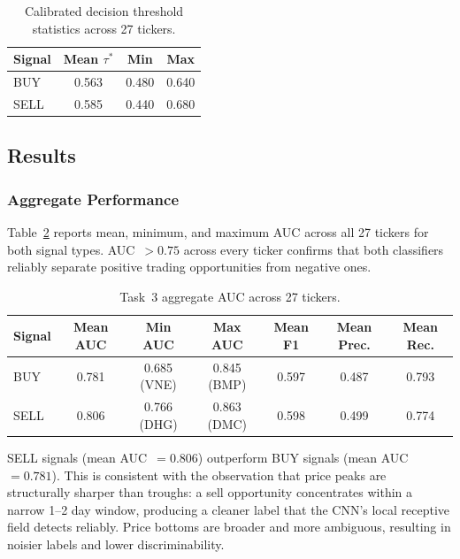 \documentclass[12pt, a4paper]{article}
\begin{document}
\begin{table}[h]
\centering
\caption{Calibrated decision threshold statistics across 27 tickers.}
\label{tab:t3_thresholds}
\renewcommand{\arraystretch}{1.3}
\begin{tabular}{lccc}
\hline
\textbf{Signal} & \textbf{Mean} $\tau^*$ & \textbf{Min} & \textbf{Max} \\
\hline
BUY  & 0.563 & 0.480 & 0.640 \\
SELL & 0.585 & 0.440 & 0.680 \\
\hline
\end{tabular}
\end{table}

\subsection{Results}

\subsubsection{Aggregate Performance}

Table~\ref{tab:t3_summary} reports mean, minimum, and maximum AUC
across all 27 tickers for both signal types. AUC~$> 0.75$ across
every ticker confirms that both classifiers reliably separate
positive trading opportunities from negative ones.




\begin{table}[h]
\centering
\caption{Task~3 aggregate AUC across 27 tickers.}
\label{tab:t3_summary}
\renewcommand{\arraystretch}{1.3}
\begin{tabular}{lcccccc}
\hline
\textbf{Signal} & \textbf{Mean AUC} & \textbf{Min AUC} & \textbf{Max AUC}
  & \textbf{Mean F1} & \textbf{Mean Prec.} & \textbf{Mean Rec.} \\
\hline
BUY  & 0.781 & 0.685 (VNE) & 0.845 (BMP) & 0.597 & 0.487 & 0.793 \\
SELL & 0.806 & 0.766 (DHG) & 0.863 (DMC) & 0.598 & 0.499 & 0.774 \\
\hline
\end{tabular}
\end{table}

SELL signals (mean AUC~$= 0.806$) outperform BUY signals
(mean AUC~$= 0.781$). This is consistent with the observation
that price peaks are structurally sharper than troughs: a sell
opportunity concentrates within a narrow 1--2 day window,
producing a cleaner label that the CNN's local receptive field
detects reliably. Price bottoms are broader and more ambiguous,
resulting in noisier labels and lower discriminability.
\end{document}
